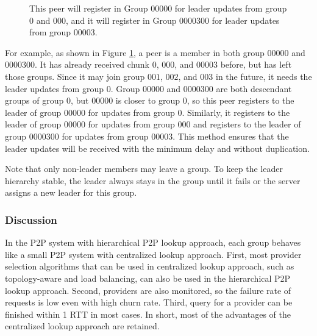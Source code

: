     \begin{figure}[t]
    \centering
    \caption{This peer will register in Group $00000$ for leader
    updates from group $0$
    and $000$, and it will register in Group $0000300$ for leader
    updates from group $00003$. 
    \label{f:register}}
    \end{figure}
    For example, as shown in Figure \ref{f:register}, a peer is a member in both group
    $00000$ and $0000300$. It has already received chunk $0$, $000$,
    and $00003$ before, but has left those groups. Since it
    may join group $001$, $002$, and $003$ in the future, it needs the
    leader updates from group $0$. Group $00000$ and $0000300$ are
    both descendant groups of group $0$, but $00000$ is closer to group
    $0$, so this peer registers to the leader of group $00000$ %
    for updates from group $0$. 
    Similarly, it registers to the leader of 
    group $00000$ %
    for updates from group $000$
    and registers to the leader of group $0000300$ %
    for updates
    from group $00003$. 
    This method ensures that the leader updates will be received with
    the minimum delay
    and without duplication.

    Note that only non-leader members may leave a group. To keep the leader
    hierarchy stable, the leader always stays in the group until
    it fails or the server assigns a new leader for this group.
    
    \subsubsection{Discussion}
    In the P2P system with hierarchical P2P lookup approach, %
    each group behaves like a small P2P system with centralized lookup
    approach. 
    First, most provider selection algorithms that can be used in centralized
    lookup approach, 
    such as topology-aware and load balancing, can also
    be used in the hierarchical P2P lookup approach. %
    Second, providers are also monitored, so the failure rate of requests is 
    low even with high churn rate. Third,
    query for a provider can be finished within 1 RTT in
    most cases. In short, most of the advantages of the 
    centralized lookup approach are retained.


